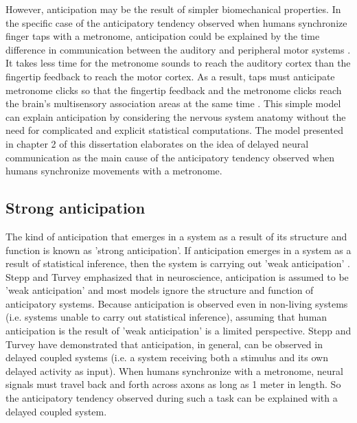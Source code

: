 \documentclass{report}
\begin{document}
However, anticipation may be the result of simpler biomechanical properties. In the specific case of the anticipatory tendency observed when humans synchronize finger taps with a metronome, anticipation could be explained by the time difference in communication between the auditory and peripheral motor systems \cite{aschersleben2002temporal}. It takes less time for the metronome sounds to reach the auditory cortex than the fingertip feedback to reach the motor cortex. As a result, taps must anticipate metronome clicks so that the fingertip feedback and the metronome clicks reach the brain’s multisensory association areas at the same time \cite{aschersleben2002temporal}. This simple model can explain anticipation by considering the nervous system anatomy without the need for complicated and explicit statistical computations. The model presented in chapter 2 of this dissertation elaborates on the idea of delayed neural communication as the main cause of the anticipatory tendency observed when humans synchronize movements with a metronome. 

\subsection{Strong anticipation}
The kind of anticipation that emerges in a system as a result of its structure and function is known as 'strong anticipation'\cite{dubois2001incursive}. If anticipation emerges in a system as a result of statistical inference, then the system is carrying out 'weak anticipation' \cite{dubois2001incursive}. Stepp and Turvey \cite{stepp2010strong} emphasized that in neuroscience, anticipation is assumed to be 'weak anticipation' and most models ignore the structure and function of anticipatory systems. Because anticipation is observed even in non-living systems (i.e. systems unable to carry out statistical inference), assuming that human anticipation is the result of 'weak anticipation' is a limited perspective. Stepp and Turvey \cite{stepp2010strong} have demonstrated that anticipation, in general, can be observed in delayed coupled systems (i.e. a system receiving both a stimulus and its own delayed activity as input). When humans synchronize with a metronome, neural signals must travel back and forth across axons as long as 1 meter in length. So the anticipatory tendency observed during such a task can be explained with a delayed coupled system.
\end{document}

